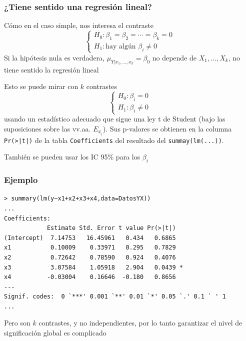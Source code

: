 \documentclass[12pt,t]{beamer}
\theoremstyle{plain}
\theoremstyle{definition}
\begin{document}
\begin{frame}
\frametitle{¿Tiene sentido una regresión lineal?}
Cómo en el caso simple, nos interesa el contraste
$$
\left\{\begin{array}{l} H_0: \beta_1=\beta_2=\cdots=\beta_k=0 \\
H_1: \mbox{hay algún }\beta_i \neq 0 \end{array}
\right.
$$
Si la hipótesis nula es verdadera, $\mu_{Y|x_1,\ldots,x_k}=\beta_0$ no depende de $X_1,\ldots,X_k$, no tiene sentido la regresión lineal\medskip

%

Esto se puede mirar con $k$ contrastes
$$
\left\{\begin{array}{l} H_0: \beta_i=0 \\
H_1: \beta_i
\neq 0 \end{array}
\right.
$$
usando un estadístico adecuado que sigue una ley t de Student (bajo las suposiciones sobre las vv.aa. $E_{\underline{x}_i}$).
Sus p-valores se obtienen en la columna \texttt{Pr(>|t|)} de la tabla \texttt{Coefficients}
del resultado del \texttt{summay(lm(...))}.\medskip

También se pueden usar los IC 95\% para los $\beta_i$
\end{frame}




\begin{frame}[fragile]
\frametitle{Ejemplo}

\begin{lstlisting}[style=petit]
> summary(lm(y~x1+x2+x3+x4,data=DatosYX))
...
Coefficients:
            Estimate Std. Error t value Pr(>|t|)  
(Intercept)  7.14753   16.45961   0.434   0.6865  
x1           0.10009    0.33971   0.295   0.7829  
x2           0.72642    0.78590   0.924   0.4076  
x3           3.07584    1.05918   2.904   0.0439 *
x4          -0.03004    0.16646  -0.180   0.8656  
---
Signif. codes:  0 `***' 0.001 `**' 0.01 `*' 0.05 `.' 0.1 ` ' 1
...
\end{lstlisting}

Pero son $k$ contrastes, y no independientes, por lo tanto garantizar el nivel de significación global es complicado
\end{frame}
\end{document}
